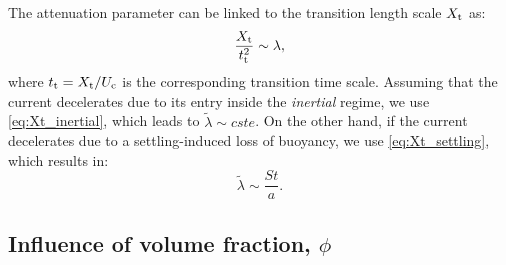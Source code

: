 \documentclass[twocolumn]{article}
\begin{document}
The attenuation parameter can be linked to the transition length scale $X_{\rm t}$ as:
\begin{equation}
	\label{eq:link_attenuation_transition_length}
	\frac{X_{\rm t}}{t_{\rm t}^{2}} \sim \lambda,
\end{equation}
where $t_{\rm t} = X_{\rm t}/U_{\rm c}$ is the corresponding transition time scale.
%
Assuming that the current decelerates due to its entry inside the \emph{inertial} regime, we use \eqref{eq:Xt_inertial}, which leads to $\tilde{\lambda} \sim cste$. On the other hand, if the current decelerates due to a settling-induced loss of buoyancy, we use \eqref{eq:Xt_settling}, which results in:
\begin{equation}
	\tilde{\lambda} \sim \frac{St}{a}.
\end{equation}


\subsection{Influence of volume fraction, $\phi$}
\label{sec:influence_phi}
\end{document}
